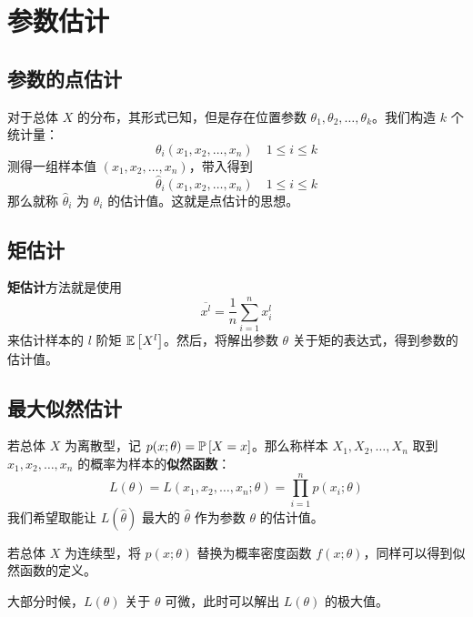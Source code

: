 \section{参数估计}

\subsection{参数的点估计}

对于总体 $X$ 的分布，其形式已知，但是存在位置参数 $\theta_1, \theta_2, \dots, \theta_k$。我们构造 $k$ 个统计量：
$$
\theta_i(x_1, x_2, \dots, x_n) \quad 1 \le i \le k
$$
测得一组样本值 $(x_1, x_2, \dots, x_n)$，带入得到
$$
\hat{\theta}_i(x_1, x_2, \dots, x_n) \quad 1 \le i \le k
$$
那么就称 $\hat{\theta}_i$ 为 $\theta_i$ 的估计值。这就是点估计的思想。

\subsection{矩估计}

\textbf{矩估计}方法就是使用
$$
\overline{x^l} = \frac{1}{n} \sum_{i = 1}^{n} x_i^l
$$
来估计样本的 $l$ 阶矩 $\operatorname{\mathbb{E}}\left[X^{l}\right]$。然后，将解出参数 $\theta$ 关于矩的表达式，得到参数的估计值。

\subsection{最大似然估计}

若总体 $X$ 为离散型，记 $p(x; \theta) = \operatorname{\mathbb{P}}\left[X = x\right]$。那么称样本 $X_1, X_2, \dots, X_n$ 取到 $x_1, x_2, \dots, x_n$ 的概率为样本的\textbf{似然函数}：
$$
L(\theta) = L(x_1, x_2, \dots, x_n; \theta) = \prod_{i = 1}^{n} p(x_i; \theta)
$$
我们希望取能让 $L(\hat{\theta})$ 最大的 $\hat{\theta}$ 作为参数 $\theta$ 的估计值。

若总体 $X$ 为连续型，将 $p(x; \theta)$ 替换为概率密度函数 $f(x; \theta)$，同样可以得到似然函数的定义。

大部分时候，$L(\theta)$ 关于 $\theta$ 可微，此时可以解出 $L(\theta)$ 的极大值。
